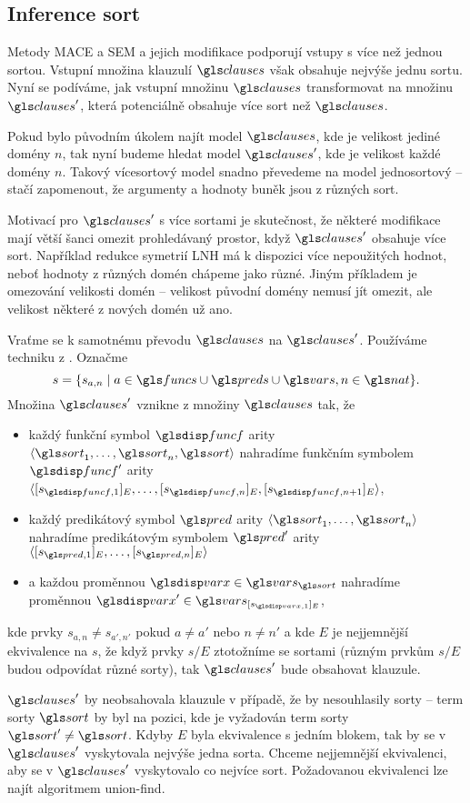 \subsection{Inference sort}

Metody MACE a SEM a jejich modifikace podporují vstupy s více než
jednou sortou. Vstupní množina klauzulí $\clauses$ však obsahuje
nejvýše jednu sortu. Nyní se podíváme, jak vstupní množinu
$\clauses$ transformovat
na množinu $\clauses'$, která potenciálně
obsahuje více sort než $\clauses$.

Pokud bylo původním úkolem najít model $\clauses$, kde je velikost
jediné domény $n$, tak nyní budeme hledat model $\clauses'$,
kde je velikost každé domény $n$. Takový vícesortový
model snadno převedeme na model jednosortový -- stačí zapomenout,
že argumenty a hodnoty buněk jsou z různých sort.

Motivací pro $\clauses'$ s více sortami je skutečnost,
že některé modifikace mají větší šanci omezit prohledávaný prostor,
když $\clauses'$ obsahuje více sort. Například
redukce symetrií LNH má k dispozici více nepoužitých hodnot,
neboť hodnoty z různých domén chápeme jako různé.
Jiným příkladem je omezování velikosti domén -- velikost původní domény
nemusí jít omezit, ale velikost některé z nových domén už ano.

Vraťme se k samotnému převodu $\clauses$ na $\clauses'$.
Používáme techniku z \cite{claessen03paradox}.
Označme
\[
  s = \{ s_{a, n} \mid  a \in \funcs \cup \preds \cup \vars, n \in \nat\}.
\]
Množina $\clauses'$ vznikne z množiny $\clauses$ tak, že
\begin{itemize}
\item každý funkční symbol $\func$ arity
  $\langle \sort_1 \comdots \sort_n, \sort \rangle$
  nahradíme funkčním symbolem $\func'$ arity
  $\langle [s_{\func, 1}]_E \comdots [s_{\func, n}]_E, [s_{\func, n + 1}]_E \rangle$,
\item každý predikátový symbol $\pred$ arity
  $\langle \sort_1 \comdots \sort_n \rangle$
  nahradíme predikátovým symbolem $\pred'$ arity
  $\langle [s_{\pred, 1}]_E \comdots [s_{\pred, n}]_E \rangle$
\item a každou proměnnou $\var \in \vars_\sort$ nahradíme
  proměnnou $\var' \in \vars_{[s_{\var, 1}]_E}$,
\end{itemize}
kde prvky $s_{a, n} \neq s_{a', n'}$ pokud $a \neq a'$ nebo $n \neq n'$
a kde $E$ je nejjemnější ekvivalence na $s$, že když prvky $s/E$
ztotožníme se sortami (různým prvkům $s/E$ budou odpovídat různé sorty),
tak $\clauses'$ bude obsahovat klauzule.

$\clauses'$ by neobsahovala klauzule v případě, že by nesouhlasily
sorty -- term sorty $\sort$ by byl na pozici,
kde je vyžadován term sorty $\sort' \neq \sort$. Kdyby $E$ byla ekvivalence
s jedním blokem, tak by se v $\clauses'$ vyskytovala nejvýše jedna sorta.
Chceme nejjemnější ekvivalenci, aby se v $\clauses'$ vyskytovalo
co nejvíce sort. Požadovanou ekvivalenci lze najít algoritmem union-find.
